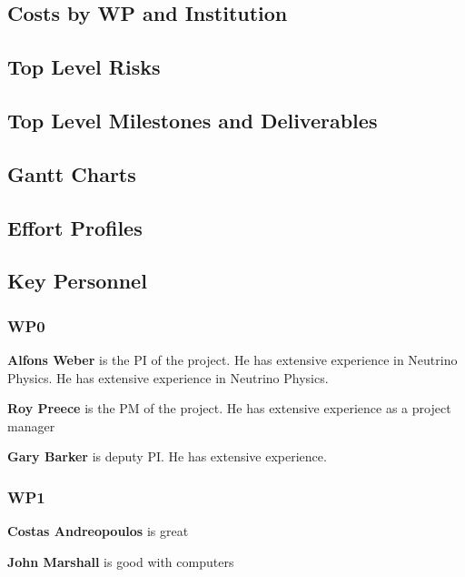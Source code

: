 \subsection{Costs by WP and Institution}

\newpage

\subsection{Top Level Risks}

\newpage

\subsection{Top Level Milestones and Deliverables}

\newpage

\subsection{Gantt Charts}

\newpage

\subsection{Effort Profiles}

\newpage

\subsection{Key Personnel }
\subsubsection{WP0}

\noindent
{\bf Alfons Weber} is the PI of the project. He has extensive experience in Neutrino Physics. He has extensive experience in Neutrino Physics.

\noindent
{\bf Roy Preece} is the PM of the project. He has extensive experience as a project manager

\noindent
{\bf Gary Barker} is deputy PI. He has extensive experience.

\subsubsection{WP1}

\noindent
{\bf Costas Andreopoulos} is great

\noindent
{\bf John Marshall} is good with computers

